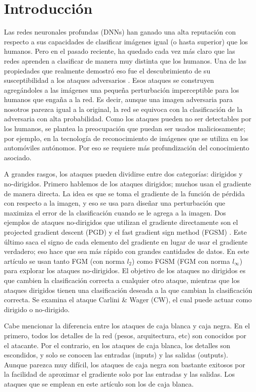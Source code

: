 \section{Introducción}

Las redes neuronales profundas (DNNs) han ganado una alta reputación con respecto a sus capacidades de clasificar imágenes igual (o hasta superior) que los humanos. Pero en el pasado reciente, ha quedado cada vez más claro que las redes aprenden a clasificar de manera muy distinta que los humanos. Una de las propiedades que realmente demostró eso fue el descubrimiento de su susceptibilidad a los ataques adversarios \cite{szegedy2014intriguing}. Esos ataques se construyen agregándoles a las imágenes una pequeña perturbación imperceptible para los humanos que engaña a la red. Es decir, aunque una imagen adversaria para nosotros parezca igual a la original, la red se equivoca con la clasificación de la adversaria con alta probabilidad. Como los ataques pueden no ser detectables por los humanos, se plantea la preocupación que puedan ser usados maliciosamente; por ejemplo, en la tecnología de reconocimiento de imágenes que se utiliza en los automóviles autónomos. Por eso se requiere más profundización del conocimiento asociado.

A grandes rasgos, los ataques pueden dividirse entre dos categorías: dirigidos y no-dirigidos. Primero hablemos de los ataques dirigidos; muchos usan el gradiente de manera directa. La idea es que se toma el gradiente de la función de pérdida con respecto a la imagen, y eso se usa para diseñar una perturbación que maximiza el error de la clasificación cuando se le agrega a la imagen. Dos ejemplos de ataques no-dirigidos que utilizan el gradiente directamente son el projected gradient descent (PGD) \cite{madry2019deep} y el fast gradient sign method (FGSM) \cite{goodfellow2015explaining}. Este último saca el signo de cada elemento del gradiente en lugar de usar el gradiente verdadero; eso hace que sea más rápido con grandes cantidades de datos. En este artículo se usan tanto FGM (con norma $l_2$) como FGSM (FGM con norma $l_\infty$) para explorar los ataques no-dirigidos. El objetivo de los ataques no dirigidos es que cambien la clasificación correcta a cualquier otro ataque, mientras que los ataques dirigidos tienen una clasificación deseada a la que cambian la clasificación correcta. Se examina el ataque Carlini \& Wager (CW), el cual puede actuar como dirigido o no-dirigido. 

Cabe mencionar la diferencia entre los ataques de caja blanca y caja negra. En el primero, todos los detalles de la red (pesos, arquitectura, etc) son conocidos por el atacante. Por el contrario, en los ataques de caja blanca, los detalles son escondidos, y solo se conocen las entradas (inputs) y las salidas (outputs). Aunque parezca muy difícil, los ataques de caja negra son bastante exitosos por la facilidad de aproximar el gradiente solo por las entradas y las salidas. Los ataques que se emplean en este artículo son los de caja blanca.

